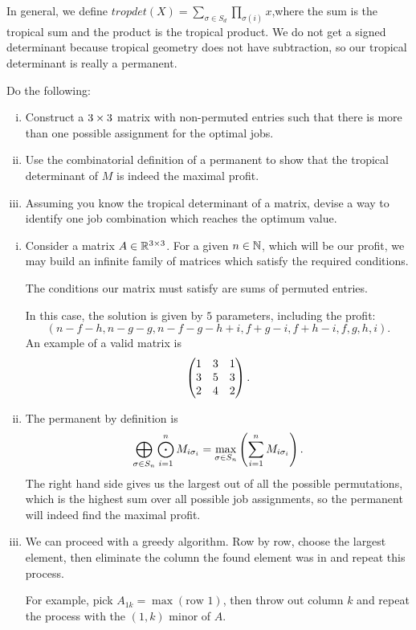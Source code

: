 \documentclass[12pt]{memoir}
\theoremstyle{definition}
\begin{document}
In general, we define $tropdet(X) = \sum_{\sigma \in S_d}  \prod_{\sigma(i)}x$,where the sum is the tropical sum and the product is the tropical product. We do not get a signed determinant because tropical geometry does not have subtraction, so our tropical determinant is really a permanent.


\begin{Ej}
    Do the following:
    \begin{enumerate}[i)]
        \itemsep=-0.4em
        \item Construct a $3\times3$ matrix with non-permuted entries such that there is more than one possible assignment for the optimal jobs.
        \item Use the combinatorial definition of a permanent to show that the tropical determinant of $M$ is indeed the maximal profit. 
        \item Assuming you know the tropical determinant of a matrix, devise a way to identify one job combination which reaches the optimum value. 
    \end{enumerate}
\end{Ej}

\begin{ptcb}
    \begin{enumerate}[i)]
        \itemsep=-0.4em
        \item Consider a matrix $A\in \mathbb{R}^{3\times3}$. For a given $n\in\mathbb{N}$, which will be our profit, we may build an infinite family of matrices which satisfy the required conditions.\par 
        The conditions our matrix must satisfy are sums of permuted entries.\par 
        In this case, the solution is given by $5$ parameters, including the profit:
        $$(n-f-h,n-g-g,n-f-g-h+i,f+g-i,f+h-i,f,g,h,i).$$
        An example of a valid matrix is 
        $$\begin{pmatrix} 1 & 3 & 1 \\ 3 & 5 & 3 \\ 2 & 4 & 2 \end{pmatrix}.$$
        \item The permanent by definition is 
        $$\bigoplus_{\sigma\in S_n}\bigodot_{i=1}^n M_{i\sigma_i}=\max_{\sigma\in S_n}\left(\sum_{i=1}^n M_{i\sigma_i}\right).$$
        The right hand side gives us the largest out of all the possible permutations, which is the highest sum over all possible job assignments, so the permanent will indeed find the maximal profit.
        \item We can proceed with a greedy algorithm. Row by row, choose the largest element, then eliminate the column the found element was in and repeat this process.\par 
        For example, pick $A_{1k}=\max(\text{row }1)$, then throw out column $k$ and repeat the process with the $(1,k)$ minor of $A$. 
    \end{enumerate}
\end{ptcb}
\end{document}
